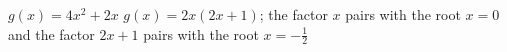 {$g(x)=4x^2+2x$}
{$g(x) = 2x(2x+1)$; the factor $x$ pairs with the root $x=0$ and the factor $2x+1$ pairs with the root $x=-\frac{1}{2}$}
